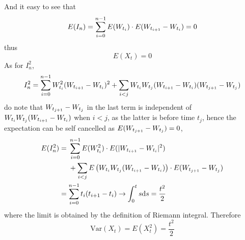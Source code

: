 \documentclass{homework}
\newcommand{\var}{\mathrm{Var}}
\begin{document}
    And it easy to see that
    \[E(I_n)=\sum_{i=0}^{n-1} E(W_{t_i})\cdot E(W_{t_{i+1}}-W_{t_i})=0\]
    thus
    \[E(X_t)=0\]
    As for $I_n^2$,
    \[I_n^2=\sum_{i=0}^{n-1}W_{t_i}^2(W_{t_{i+1}}-W_{t_i})^2
    +\sum_{i<j}W_{t_i}W_{t_j}(W_{t_{i+1}}-W_{t_i})(W_{t_{j+1}}-W_{t_j})\]
    do note that $W_{t_{j+1}}-W_{t_j}$ in the last term is independent
    of $W_{t_i}W_{t_j}(W_{t_{i+1}}-W_{t_i})$ when $i<j$, as the latter is before
    time $t_j$, hence the expectation can be self cancelled
    as $E(W_{t_{j+1}}-W_{t_j})=0$,
    \[\begin{aligned}
        E(I_n^2)
        &=\begin{aligned}[t]
         &\sum_{i=0}^{n-1} E(W_{t_i}^2)\cdot E(|W_{t_{i+1}}-W_{t_i}|^2)\\
         &+\sum_{i<j}E\left(W_{t_i}W_{t_j}(W_{t_{i+1}}-W_{t_i})\right)\cdot E(W_{t_{j+1}}-W_{t_j})
         \end{aligned}\\
        &=\sum_{i=0}^{n-1} t_i(t_{i+1}-t_i)
        \to\int_0^ts\mathrm d s=\frac{t^2}{2}
    \end{aligned}\]
    where the limit is obtained by the definition of Riemann integral.
    Therefore
    \[\var(X_t)=E(X_t^2)=\frac{t^2}{2}\]
\end{document}
